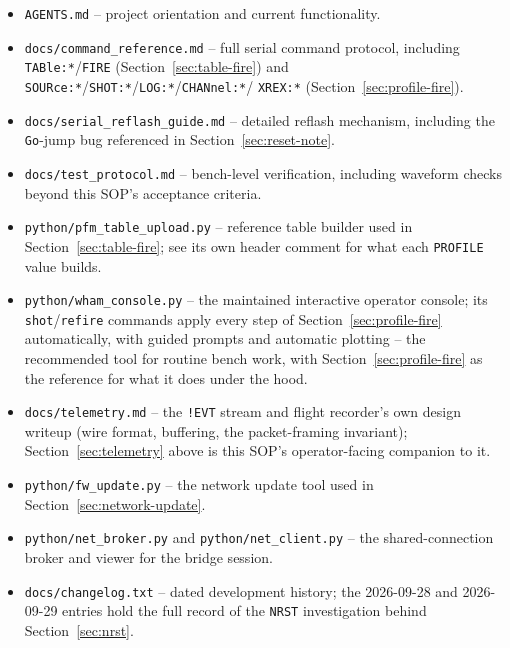 \documentclass[11pt]{article}
\newcommand{\code}[1]{\texttt{#1}}
\begin{document}
\begin{itemize}
  \item \code{AGENTS.md} -- project orientation and current functionality.
  \item \code{docs/command\_reference.md} -- full serial command protocol,
    including \code{TABle:*}/\code{FIRE} (Section~\ref{sec:table-fire})
    and \code{SOURce:*}/\code{SHOT:*}/\code{LOG:*}/\code{CHANnel:*}/
    \code{XREX:*} (Section~\ref{sec:profile-fire}).
  \item \code{docs/serial\_reflash\_guide.md} -- detailed reflash
    mechanism, including the \code{Go}-jump bug referenced in
    Section~\ref{sec:reset-note}.
  \item \code{docs/test\_protocol.md} -- bench-level verification,
    including waveform checks beyond this SOP's acceptance criteria.
  \item \code{python/pfm\_table\_upload.py} -- reference table builder
    used in Section~\ref{sec:table-fire}; see its own header comment
    for what each \code{PROFILE} value builds.
  \item \code{python/wham\_console.py} -- the maintained interactive
    operator console; its \code{shot}/\code{refire} commands apply
    every step of Section~\ref{sec:profile-fire} automatically, with
    guided prompts and automatic plotting -- the recommended tool for
    routine bench work, with Section~\ref{sec:profile-fire} as the
    reference for what it does under the hood.
  \item \code{docs/telemetry.md} -- the \code{!EVT} stream and flight
    recorder's own design writeup (wire format, buffering, the
    packet-framing invariant); Section~\ref{sec:telemetry} above is
    this SOP's operator-facing companion to it.
  \item \code{python/fw\_update.py} -- the network update tool used in
    Section~\ref{sec:network-update}.
  \item \code{python/net\_broker.py} and \code{python/net\_client.py}
    -- the shared-connection broker and viewer for the bridge session.
  \item \code{docs/changelog.txt} -- dated development history; the
    2026-09-28 and 2026-09-29 entries hold the full record of the
    \code{NRST} investigation behind Section~\ref{sec:nrst}.
\end{itemize}
\end{document}

